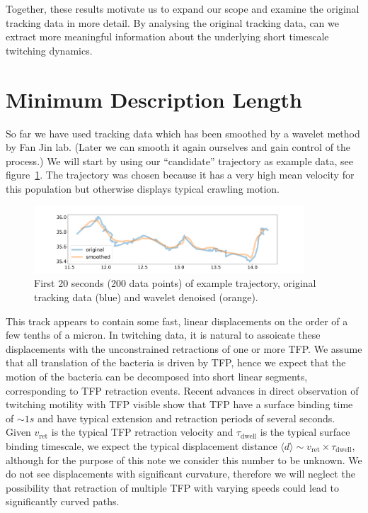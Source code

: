 \documentclass{article}
\newcommand{\mean}[1]{\langle{#1}\rangle}
\begin{document}
Together, these results motivate us to expand our scope and examine the original tracking
data in more detail. By analysing the original tracking data, can we extract more meaningful
information about the underlying short timescale twitching dynamics.

\section{Minimum Description Length}

So far we have used tracking data which has been smoothed by a wavelet method
by Fan Jin lab. {\color{red} (Later we can smooth it again ourselves and gain control of the process.)}
We will start by using our ``candidate'' trajectory as example data, see figure~\ref{fig:candidate_track}. 
The trajectory was chosen because it has a very high mean velocity for this population but otherwise displays typical crawling motion.

\begin{figure}[h]
    \centering
    \includegraphics[width=0.9\textwidth]{example_track_data_20s.png}
    \caption{First 20 seconds (200 data points) of example trajectory, original tracking data (blue) and wavelet denoised (orange).
    }
    \label{fig:candidate_track}
\end{figure}

\newcommand{\vret}{v_{\mathrm{ret}}}
\newcommand{\tdwell}{\ensuremath{\tau_\text{dwell}}}

This track appears to contain some fast, linear displacements on the order of a few tenths of a micron.
In twitching data, it is natural to assoicate these displacements with the unconstrained retractions 
of one or more TFP. We assume that all translation of the bacteria is driven by TFP, hence we 
expect that the motion of the bacteria can be decomposed into short linear segments, corresponding
to TFP retraction events. 
Recent advances in direct observation of twitching motility with TFP visible 
show that TFP have a surface binding time of $\sim 1s$ and have typical extension and retraction
periods of several seconds\cite{tala2019pseudomonas,koch2021competitive}. 
Given $\vret$ is the typical TFP retraction velocity
and $\tdwell$ is the typical surface binding timescale, we expect the typical displacement distance
$\mean{d} \sim \vret \times \tdwell$, although for the purpose of this note
we consider this number to be unknown.
We do not see displacements with significant curvature, therefore we will neglect the possibility
that retraction of multiple TFP with varying speeds could lead to significantly curved paths.
\end{document}
